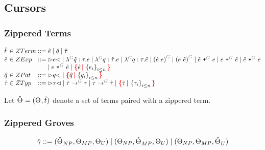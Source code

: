 
\subsection{Cursors}


\subsubsection{Zippered Terms}

\[
  \arraycolsep=0pt
  \begin{array}{lcllll}
    \Z{t} & {}\in{} & ZTerm & {}::={} &
      \Z{e}
      \mid \Z{q}
      \mid \Z{\tau}
    \\
    \Z{e} & {}\in{} & ZExp & {}::={} &
      \cursor{e}
      \mid \eFun{G}{\Z{q}}{\tau}{e}
      \mid \eFun{G}{q}{\Z{\tau}}{e}
      \mid \eFun{G}{q}{\tau}{\Z{e}}
      \mid \eApp{G}{\Z{e}}{e}
      \mid \eApp{G}{e}{\Z{e}}
      \mid \ePlus{G}{\Z{e}}{e}
      \mid \ePlus{G}{e}{\Z{e}}
      \mid \eTimes{G}{\Z{e}}{e}
      \\
    &&&&
      \mid \eTimes{G}{e}{\Z{e}}
      \mid \conflictHole{\Z{e}, \SetOf{e_i}_{i \leq n}}
    \\
    \Z{q} & {}\in{} & ZPat & {}::={} &
      \cursor{q}
      \mid \conflictHole{\Z{q}, \SetOf{q_i}_{i \leq n}}
    \\
    \Z{\tau} & {}\in{} & ZTyp & {}::={} &
      \cursor{\tau}
      \mid \tArrow{G}{\Z{\tau}}{\tau}
      \mid \tArrow{G}{\tau}{\Z{\tau}}
      \mid \conflictHole{\Z{\tau}, \SetOf{\tau_i}_{i \leq n}}
    \\
  \end{array}
\]

Let $\hat{\Theta_{}} = (\Theta_{}, \hat{t})$ denote a set of terms paired with a zippered term.


\subsubsection{Zippered Groves}

\begin{gather*}
  \arraycolsep=0pt
  \begin{array}{lll}
    \Z{\gamma} & {}::={} &
      (\Z{\Set}_{NP}, \Set[MP], \Set[U])
      \mid (\Set[NP], \Z{\Set}_{MP}, \Set[U])
      \mid (\Set[NP], \Set[MP], \Z{\Set}_U)
  \end{array}
\end{gather*}

